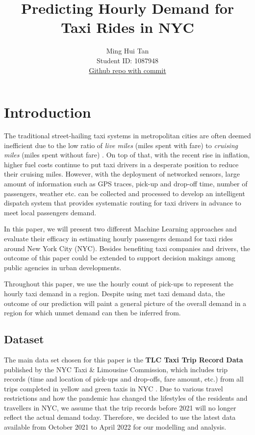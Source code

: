 \documentclass[11pt]{article}
\title{\textbf{Predicting Hourly Demand for Taxi Rides in NYC}}
\author{
Ming Hui Tan \\
Student ID: 1087948\\
\href{https://github.com/MAST30034-Applied-Data-Science/mast30034-project-1-olivertan1999}{Github repo with commit}
}
\begin{document}
\maketitle

\section{Introduction}
The traditional street-hailing taxi systems in metropolitan cities are often deemed inefficient due to the low ratio of \textit{live miles} (miles spent with fare) to \textit{cruising miles} (miles spent without fare) \cite{inproceedings}. On top of that, with the recent rise in inflation, higher fuel costs continue to put taxi drivers in a desperate position to reduce their cruising miles. However, with the deployment of networked sensors, large amount of information such as GPS traces, pick-up and drop-off time, number of passengers, weather etc. can be collected and processed to develop an intelligent dispatch system that provides systematic routing for taxi drivers in advance to meet local passengers demand. 

In this paper, we will present two different Machine Learning approaches and evaluate their efficacy in estimating hourly passengers demand for taxi rides around New York City (NYC). Besides benefiting taxi companies and drivers, the outcome of this paper could be extended to support decision makings among public agencies in urban developments.

Throughout this paper, we use the hourly count of pick-ups to represent the hourly taxi demand in a region. Despite using met taxi demand data, the outcome of our prediction will paint a general picture of the overall demand in a region for which unmet demand can then be inferred from.  

\subsection{Dataset}
The main data set chosen for this paper is the \textbf{TLC Taxi Trip Record Data} published by the NYC Taxi \& Limousine Commission, which includes trip records (time and location of pick-ups and drop-offs, fare amount, etc.) from all trips completed in yellow and green taxis in NYC \cite{tlctriprecorddata}. Due to various travel restrictions and how the pandemic has changed the lifestyles of the residents and travellers in NYC, we assume that the trip records before 2021 will no longer reflect the actual demand today. Therefore, we decided to use the latest data available from October 2021 to April 2022 for our modelling and analysis.
\end{document}
